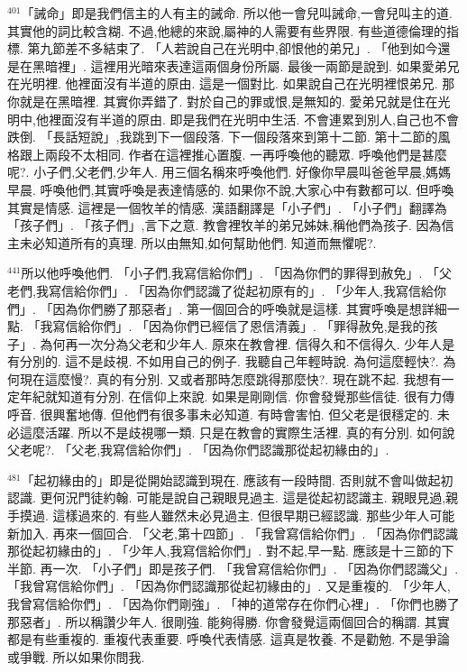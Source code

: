 \documentclass{book}
\begin{document}
$^{401}$「誡命」即是我們信主的人有主的誡命.
所以他一會兒叫誡命,一會兒叫主的道.
其實他的詞比較含糊.
不過,他總的來說,屬神的人需要有些界限.
有些道德倫理的指標.
第九節差不多結束了.
「人若說自己在光明中,卻恨他的弟兄」.
「他到如今還是在黑暗裡」.
這裡用光暗來表達這兩個身份所屬.
最後一兩節是說到.
如果愛弟兄在光明裡.
他裡面沒有半道的原由.
這是一個對比.
如果說自己在光明裡恨弟兄.
那你就是在黑暗裡.
其實你弄錯了.
對於自己的罪或恨,是無知的.
愛弟兄就是住在光明中,他裡面沒有半道的原由.
即是我們在光明中生活.
不會連累到別人,自己也不會跌倒.
「長話短說」,我跳到下一個段落.
下一個段落來到第十二節.
第十二節的風格跟上兩段不太相同.
作者在這裡推心置腹.
一再呼喚他的聽眾.
呼喚他們是甚麼呢?.
小子們,父老們,少年人.
用三個名稱來呼喚他們.
好像你早晨叫爸爸早晨,媽媽早晨.
呼喚他們,其實呼喚是表達情感的.
如果你不說,大家心中有數都可以.
但呼喚其實是情感.
這裡是一個牧羊的情感.
漢語翻譯是「小子們」.
「小子們」翻譯為「孩子們」.
「孩子們」,言下之意.
教會裡牧羊的弟兄姊妹,稱他們為孩子.
因為信主未必知道所有的真理.
所以由無知,如何幫助他們.
知道而無懼呢?.

$^{441}$所以他呼喚他們.
「小子們,我寫信給你們」.
「因為你們的罪得到赦免」.
「父老們,我寫信給你們」.
「因為你們認識了從起初原有的」.
「少年人,我寫信給你們」.
「因為你們勝了那惡者」.
第一個回合的呼喚就是這樣.
其實呼喚是想詳細一點.
「我寫信給你們」.
「因為你們已經信了恩信清義」.
「罪得赦免,是我的孩子」.
為何再一次分為父老和少年人.
原來在教會裡.
信得久和不信得久.
少年人是有分別的.
這不是歧視.
不如用自己的例子.
我聽自己年輕時說.
為何這麼輕快?.
為何現在這麼慢?.
真的有分別.
又或者那時怎麼跳得那麼快?.
現在跳不起.
我想有一定年紀就知道有分別.
在信仰上來說.
如果是剛剛信.
你會發覺那些信徒.
很有力傳呼音.
很興奮地傳.
但他們有很多事未必知道.
有時會害怕.
但父老是很穩定的.
未必這麼活躍.
所以不是歧視哪一類.
只是在教會的實際生活裡.
真的有分別.
如何說父老呢?.
「父老,我寫信給你們」.
「因為你們認識那從起初緣由的」.

$^{481}$「起初緣由的」即是從開始認識到現在.
應該有一段時間.
否則就不會叫做起初認識.
更何況門徒約翰.
可能是說自己親眼見過主.
這是從起初認識主.
親眼見過,親手摸過.
這樣過來的.
有些人雖然未必見過主.
但很早期已經認識.
那些少年人可能新加入.
再來一個回合.
「父老,第十四節」.
「我曾寫信給你們」.
「因為你們認識那從起初緣由的」.
「少年人,我寫信給你們」.
對不起,早一點.
應該是十三節的下半節.
再一次.
「小子們」即是孩子們.
「我曾寫信給你們」.
「因為你們認識父」.
「我曾寫信給你們」.
「因為你們認識那從起初緣由的」.
又是重複的.
「少年人,我曾寫信給你們」.
「因為你們剛強」.
「神的道常存在你們心裡」.
「你們也勝了那惡者」.
所以稱讚少年人.
很剛強.
能夠得勝.
你會發覺這兩個回合的稱謂.
其實都是有些重複的.
重複代表重要.
呼喚代表情感.
這真是牧養.
不是勸勉.
不是爭論或爭戰.
所以如果你問我.
\end{document}
